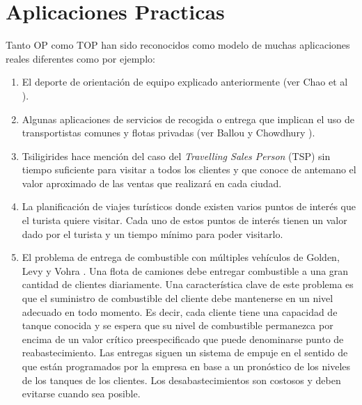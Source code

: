 \section{Aplicaciones Practicas}

Tanto OP como TOP han sido reconocidos como modelo de muchas aplicaciones reales diferentes como por ejemplo:

\begin{enumerate}[i]

\item

El deporte de orientación de equipo explicado anteriormente (ver Chao et al \cite{ChaoGoldenWasil}). 

\item

Algunas aplicaciones de servicios de recogida o entrega que implican el uso de transportistas comunes y flotas privadas (ver Ballou y Chowdhury \cite{BallouChowdhury}). 

\item

Tsiligirides \cite{Tsiligirides} hace mención del caso del \textit{Travelling Sales Person} (TSP) sin tiempo suficiente para visitar a todos los clientes y que conoce de antemano el valor aproximado de las ventas que realizará en cada ciudad.

\item

La planificación de viajes turísticos donde existen varios puntos de interés que el turista quiere visitar. Cada uno de estos puntos de interés tienen un valor dado por el turista y un tiempo mínimo para poder visitarlo.

\item

El problema de entrega de combustible con múltiples vehículos de Golden, Levy y Vohra \cite{GoldenLevyVohra}. Una flota de camiones debe entregar combustible a una gran cantidad de clientes diariamente. Una característica clave de este problema es que el suministro de combustible del cliente debe mantenerse en un nivel adecuado en todo momento. Es decir, cada cliente tiene una capacidad de tanque conocida y se espera que su nivel de combustible permanezca por encima de un valor crítico preespecificado que puede denominarse punto de reabastecimiento. Las entregas siguen un sistema de empuje en el sentido de que están programados por la empresa en base a un pronóstico de los niveles de los tanques de los clientes. Los desabastecimientos son costosos y deben evitarse cuando sea posible.


\end{enumerate}
